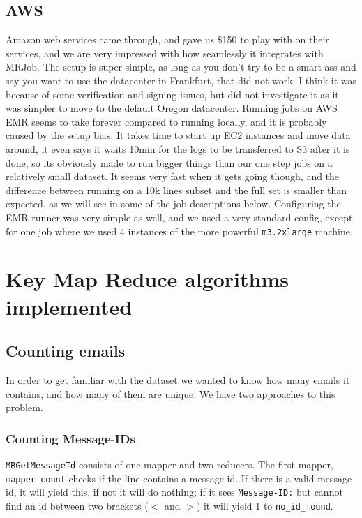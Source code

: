 \documentclass[runningheads,a4paper]{llncs}
\begin{document}
\subsection{AWS}
Amazon web services came through, and gave us \$150 to play with on their services, and we are very impressed with how seamlessly it integrates with MRJob.
\newline
The setup is super simple, as long as you don't try to be a smart ass and say you want to use the datacenter in Frankfurt, that did not work. I think it was because of some verification and signing issues, but did not investigate it as it was simpler to move to the default Oregon datacenter.
\newline
Running jobs on AWS EMR seems to take forever compared to running locally, and it is probably caused by the setup bias. It takes time to start up EC2 instances and move data around, it even says it waits 10min for the logs to be transferred to S3 after it is done, so its obviously made to run bigger things than our one step jobs on a relatively small dataset. It seems very fast when it gets going though, and the difference between running on a 10k lines subset and the full set is smaller than expected, as we will see in some of the job descriptions below. Configuring the EMR runner was very simple as well, and we used a very standard config, except for one job where we used 4 instances of the more powerful \verb!m3.2xlarge! machine.
\section{Key Map Reduce algorithms implemented}
\label{sec:mapreducealgorithms}
\subsection{Counting emails}
\label{sec:41_counting}
In order to get familiar with the dataset we wanted to know how many emails it contains, and how many of them are unique. We have two approaches to this problem.
\subsubsection{Counting Message-IDs} 
\verb!MRGetMessageId! consists of one mapper and two reducers. The first mapper, \verb!mapper_count! checks if the line contains a message id. If there is a valid message id, it will yield this, if not it will do nothing; if it sees \verb!Message-ID:! but cannot find an id between two brackets ($<$ and $>$) it will yield 1 to \verb!no_id_found!. 
\end{document}
